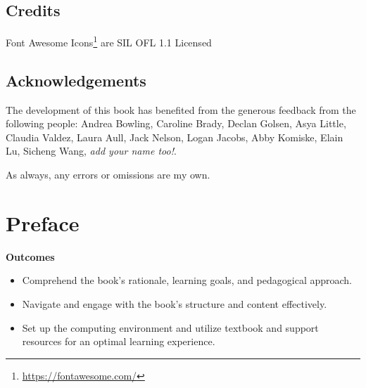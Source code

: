 \documentclass[
  letterpaper,
]{book}
\providecommand{\tightlist}{%
  \setlength{\itemsep}{0pt}\setlength{\parskip}{0pt}}\usepackage{longtable,booktabs,array}
\theoremstyle{definition}
\theoremstyle{remark}
\DeclareRobustCommand{\href}[2]{#2\footnote{\url{#1}}}
\begin{document}
\section*{Credits}\label{credits}


\href{https://fontawesome.com/}{Font Awesome Icons} are SIL OFL 1.1
Licensed

\section*{Acknowledgements}\label{acknowledgements}


The development of this book has benefited from the generous feedback
from the following people: Andrea Bowling, Caroline Brady, Declan
Golsen, Asya Little, Claudia Valdez, Laura Aull, Jack Nelson, Logan
Jacobs, Abby Komiske, Elain Lu, Sicheng Wang, \emph{add your name too!}.

As always, any errors or omissions are my own.


\chapter*{Preface}\label{sec-preface}


\begin{tcolorbox}[enhanced jigsaw, breakable, colframe=quarto-callout-color-frame, toprule=.15mm, arc=.35mm, colback=white, left=2mm, bottomrule=.15mm, rightrule=.15mm, opacityback=0, leftrule=.75mm]

\textbf{ Outcomes}

\begin{itemize}
\tightlist
\item
  Comprehend the book's rationale, learning goals, and pedagogical
  approach.
\item
  Navigate and engage with the book's structure and content effectively.
\item
  Set up the computing environment and utilize textbook and support
  resources for an optimal learning experience.
\end{itemize}

\end{tcolorbox}
\end{document}
